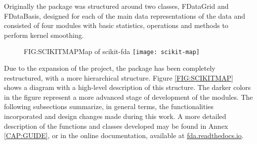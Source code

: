 
Originally the package was structured around two classes, FDataGrid and
FDataBasis, designed for each of the main data representations of the data and
consisted of four modules with basic statistics, operations and methods to
perform kernel smoothing.

\begin{figure}[Map of scikit-fda]{FIG:SCIKITMAP}{Map of scikit-fda \cite{ramos-carrenoScikitfdaPythonPackage2019}}
	\texttt{[image: scikit-map]}
\end{figure}


Due to the expansion of the project, the package has been completely
restructured, with a more hierarchical structure. Figure \ref{FIG:SCIKITMAP}
shows a diagram with a high-level description of this structure. The darker colors in the figure represent a more advanced stage of development of the modules. 
The following
subsections summarize, in general terms, the functionalities incorporated and
design changes made during this work. A more detailed description of the functions and classes developed may be found
in Annex \ref{CAP:GUIDE}, or in the online documentation, available at \href{https://fda.readthedocs.io/}{fda.readthedocs.io}.

